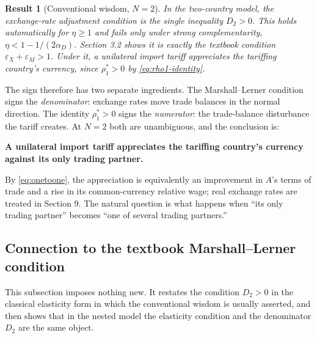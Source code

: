 \documentclass[11pt]{article}
\newtheorem{result}{Result}[section]
\begin{document}
\begin{result}[Conventional wisdom, $N=2$]
In the two-country model, the exchange-rate adjustment condition is the single inequality $D_2 > 0$. This holds automatically for $\eta \geq 1$ and fails only under strong complementarity, $\eta < 1 - 1/(2\alpha_D)$. Section 3.2 shows it is exactly the textbook condition $\varepsilon_X + \varepsilon_M > 1$. Under it, a unilateral import tariff appreciates the tariffing country's currency, since $\rho_1^* > 0$ by \eqref{eq:rho1-identity}.
\end{result}

The sign therefore has two separate ingredients. The Marshall--Lerner condition signs the \emph{denominator}: exchange rates move trade balances in the normal direction. The identity $\rho_1^* > 0$ signs the \emph{numerator}: the trade-balance disturbance the tariff creates. At $N = 2$ both are unambiguous, and the conclusion is:

\begin{center}
\textbf{A unilateral import tariff appreciates the tariffing country's currency against its only trading partner.}
\end{center}

\noindent By \eqref{eq:onetoone}, the appreciation is equivalently an improvement in $A$'s terms of trade and a rise in its common-currency relative wage; real exchange rates are treated in Section 9. The natural question is what happens when ``its only trading partner'' becomes ``one of several trading partners.''

\subsection{Connection to the textbook Marshall--Lerner condition}
\label{sec:ml}

This subsection imposes nothing new. It restates the condition $D_2 > 0$ in the classical elasticity form in which the conventional wisdom is usually asserted, and then shows that in the nested model the elasticity condition and the denominator $D_2$ are the same object.
\end{document}
